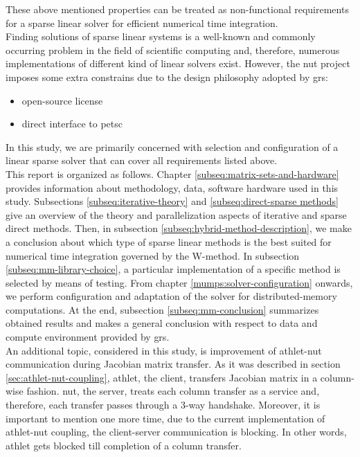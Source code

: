 These above mentioned properties can be treated as non-functional requirements for a sparse linear solver for efficient numerical time integration.\\

 
Finding solutions of sparse linear systems is a well-known and commonly occurring problem in the field of scientific computing and, therefore, numerous implementations of different kind of linear solvers exist. However, the \gls{nut} project imposes some extra constrains due to the design philosophy adopted by \gls{grs}: \\


\begin{itemize}
	\item open-source license
	\item direct interface to \gls{petsc}
\end{itemize}



In this study, we are primarily concerned with selection and configuration of a linear sparse solver that can cover all requirements listed above.\\


This report is organized as follows. Chapter \ref{subseq:matrix-sets-and-hardware} provides information about methodology, data, software hardware used in this study. Subsections \ref{subseq:iterative-theory} and \ref{subseq:direct-sparse methods} give an overview of the theory and parallelization aspects of iterative and sparse direct methods. Then, in subsection \ref{subseq:hybrid-method-description}, we make a conclusion about which type of sparse linear methods is the best suited for numerical time integration governed by the W-method. In subsection 
\ref{subseq:mm-library-choice}, a particular implementation of a specific method is selected by means of testing. From chapter \ref{mumps:solver-configuration} onwards, we perform configuration and adaptation of the solver for distributed-memory computations. At the end, subsection \ref{subseq:mm-conclusion} summarizes obtained results and makes a general conclusion with respect to data and compute environment provided by  \gls{grs}.\\




An additional topic, considered in this study, is improvement of \gls{athlet}-\gls{nut} communication during Jacobian matrix transfer. As it was described in section \ref{sec:athlet-nut-coupling}, \gls{athlet}, the client, transfers Jacobian matrix in a column-wise fashion. \gls{nut}, the server, treats each column transfer as a service and, therefore, each transfer passes through a 3-way handshake. Moreover, it is important to mention one more time,   due to the current implementation of \gls{athlet}-\gls{nut} coupling, the client-server communication is blocking. In other words, \gls{athlet} gets blocked till completion of a column transfer. \\


